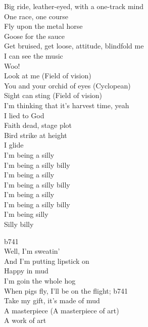 Big ride, leather-eyed, with a one-track mind\\
One race, one course\\
Fly upon the metal horse\\
Goose for the sauce\\
Get bruised, get loose, attitude, blindfold me\\
I can see the music\\
Woo!\\

Look at me (Field of vision)\\
You and your orchid of eyes (Cyclopean)\\
Sight can sting (Field of vision)\\
I'm thinking that it's harvest time, yeah\\

I lied to God\\
Faith dead, stage plot\\
Bird strike at height\\
I glide\\

I'm being a silly\\
I'm being a silly billy\\
I'm being a silly\\
I'm being a silly billy\\
I'm being a silly\\
I'm being a silly billy\\
I'm being silly\\
Silly billy\\



b741\\

Well, I'm sweatin'\\
And I'm putting lipstick on\\
Happy in mud\\
I'm goin the whole hog\\

When pigs fly, I'll be on the flight; b741\\

Take my gift, it's made of mud\\
A masterpiece (A masterpiece of art)\\
A work of art\\

